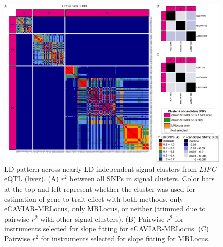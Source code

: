 \documentclass[11pt]{article}
\begin{document}
\begin{figure}[!ht]
  \centering
  \includegraphics[width=\textwidth]{figs/region/heatmap_eQTLbase.Liver_LIPC_HDL.20210114.png}
  \caption{LD pattern across nearly-LD-independent signal clusters
    from \emph{LIPC} eQTL (liver).
    (A) $r^2$ between all SNPs in signal clusters. Color bars at the
    top and left represent whether the cluster was used for estimation of
    gene-to-trait effect with both methods, only eCAVIAR-MRLocus, only
    MRLocus, or neither (trimmed due to pairwise $r^2$ with other
    signal clusters). (B) Pairwise $r^2$ for instruments selected for
    slope fitting for eCAVIAR-MRLocus. (C) Pairwise $r^2$ for
    instruments selected for slope fitting for MRLocus.}
\end{figure}
\end{document}
